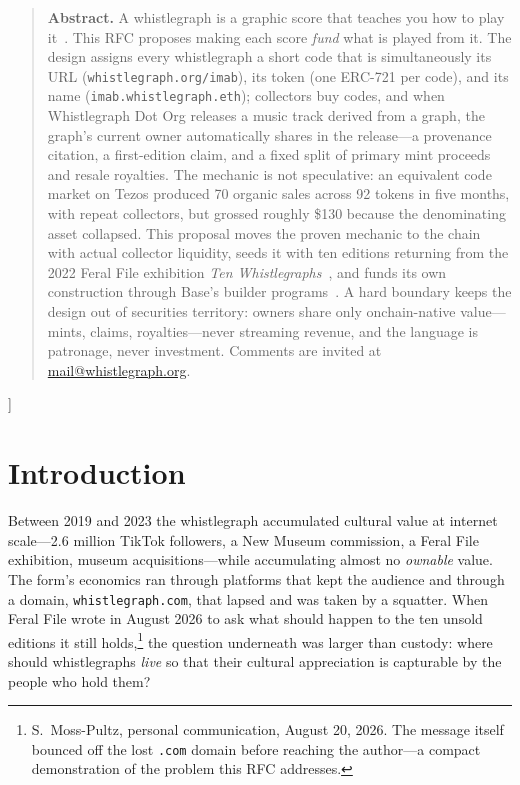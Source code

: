 \documentclass[10pt,letterpaper,twocolumn]{article}
\newcommand{\code}[1]{\texttt{#1}}
\begin{document}
{\begin{quote}
\small\noindent\textbf{Abstract.}
A whistlegraph is a graphic score that teaches you how to play it~\citep{scudder2026whistlegraph}. This RFC proposes making each score \emph{fund} what is played from it. The design assigns every whistlegraph a short code that is simultaneously its URL (\code{whistlegraph.org/imab}), its token (one ERC-721 per code), and its name (\code{imab.whistlegraph.eth}); collectors buy codes, and when Whistlegraph Dot Org releases a music track derived from a graph, the graph's current owner automatically shares in the release---a provenance citation, a first-edition claim, and a fixed split of primary mint proceeds and resale royalties. The mechanic is not speculative: an equivalent code market on Tezos produced 70 organic sales across 92 tokens in five months, with repeat collectors, but grossed roughly \$130 because the denominating asset collapsed. This proposal moves the proven mechanic to the chain with actual collector liquidity, seeds it with ten editions returning from the 2022 Feral File exhibition \emph{Ten Whistlegraphs}~\citep{feralfile2022ten}, and funds its own construction through Base's builder programs~\citep{base2026funded}. A hard boundary keeps the design out of securities territory: owners share only onchain-native value---mints, claims, royalties---never streaming revenue, and the language is patronage, never investment. Comments are invited at \href{mailto:mail@whistlegraph.org}{mail@whistlegraph.org}.
\end{quote}
\vspace{0.5em}
}]

\section{Introduction}

Between 2019 and 2023 the whistlegraph accumulated cultural value at internet scale---2.6 million TikTok followers, a New Museum commission, a Feral File exhibition, museum acquisitions---while accumulating almost no \emph{ownable} value. The form's economics ran through platforms that kept the audience and through a domain, \code{whistlegraph.com}, that lapsed and was taken by a squatter. When Feral File wrote in August 2026 to ask what should happen to the ten unsold editions it still holds,\footnote{S.~Moss-Pultz, personal communication, August 20, 2026. The message itself bounced off the lost \code{.com} domain before reaching the author---a compact demonstration of the problem this RFC addresses.} the question underneath was larger than custody: where should whistlegraphs \emph{live} so that their cultural appreciation is capturable by the people who hold them?
\end{document}
